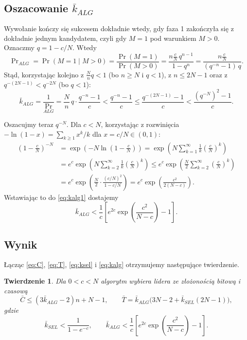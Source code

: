 \documentclass[11pt,a4paper]{article}
\newtheorem{theorem}{Twierdzenie}
\begin{document}
\subsection{Oszacowanie $\bar{k}_{ALG}$}

Wywołanie kończy się sukcesem dokładnie wtedy, gdy faza 1 zakończyła się z dokładnie jednym kandydatem, czyli gdy $M = 1$ pod warunkiem $M > 0$. Oznaczmy $q = 1 - c/N$. Wtedy
\[
    \Pr\nolimits_{ALG} = \Pr(M=1 \mid M>0) = \frac{\Pr(M=1)}{\Pr(M>0)}
    = \frac{n\frac{c}{N}\,q^{n-1}}{1-q^{n}}
    = \frac{n\frac{c}{N}}{(q^{-n}-1)\,q}.
\]
Stąd, korzystając kolejno z $\frac{N}{n}q < 1$ (bo $n \geq N$ i $q<1$), z $n \leq 2N-1$ oraz z $q^{-(2N-1)} < q^{-2N}$ (bo $q<1$):
\begin{equation}\label{eq:kalg1}
    \bar{k}_{ALG} = \frac{1}{\Pr_{ALG}} = \frac{N}{n}\,q\cdot\frac{q^{-n}-1}{c}
    < \frac{q^{-n}-1}{c} \leq \frac{q^{-(2N-1)}-1}{c} < \frac{\left(q^{-N}\right)^{2}-1}{c}.
\end{equation}

Oszacujmy teraz $q^{-N}$. Dla $c < N$, korzystając z rozwinięcia $-\ln(1-x) = \sum_{k \geq 1} x^k/k$ dla $x = c/N \in (0,1)$:
\begin{align*}
    \left(1-\frac{c}{N}\right)^{-N}
    &= \exp\left(-N\ln\left(1-\frac{c}{N}\right)\right) = \exp\left(N\sum_{k=1}^{\infty}\frac{1}{k}\left(\frac{c}{N}\right)^{k}\right) \\
    &= e^{c}\exp\left(N\sum_{k=2}^{\infty}\frac{1}{k}\left(\frac{c}{N}\right)^{k}\right)
    \leq e^{c}\exp\left(\frac{N}{2}\sum_{k=2}^{\infty}\left(\frac{c}{N}\right)^{k}\right) \\
    &= e^{c}\exp\left(\frac{N}{2}\cdot\frac{(c/N)^{2}}{1-c/N}\right)
    = e^{c}\exp\left(\frac{c^{2}}{2(N-c)}\right).
\end{align*}
Wstawiając to do \eqref{eq:kalg1} dostajemy
\begin{equation}\label{eq:kalg}
    \bar{k}_{ALG} < \frac{1}{c}\left[e^{2c}\exp\left(\frac{c^{2}}{N-c}\right) - 1\right].
\end{equation}

\subsection{Wynik}

Łącząc \eqref{eq:C}, \eqref{eq:T}, \eqref{eq:ksel} i \eqref{eq:kalg} otrzymujemy następujące twierdzenie.

\begin{theorem}
    Dla $0 < c < N$ algorytm wybiera lidera ze złożonością bitową i czasową
    \[
        \bar{C} \leq (3\bar{k}_{ALG}-2)n + N - 1, \qquad
        \bar{T} = \bar{k}_{ALG}\bigl(3N-2+\bar{k}_{SEL}(2N-1)\bigr),
    \]
    gdzie
    \[
        \bar{k}_{SEL} < \frac{1}{1-e^{-c}}, \qquad
        \bar{k}_{ALG} < \frac{1}{c}\left[e^{2c}\exp\left(\frac{c^{2}}{N-c}\right) - 1\right].
    \]
\end{theorem}
\end{document}
